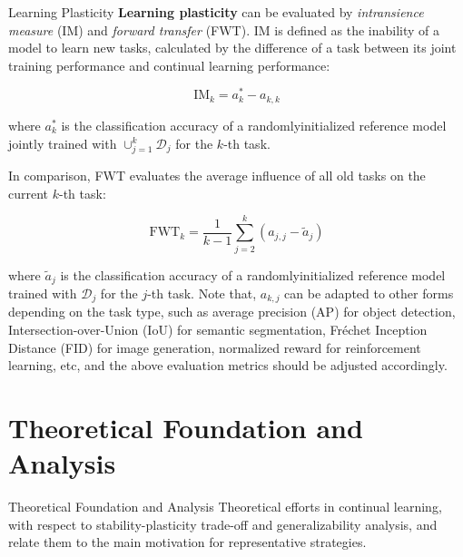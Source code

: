 \documentclass[9pt,dvipsnames]{beamer}
\begin{document}
\begin{frame}{Learning Plasticity}
    \textbf{Learning plasticity} can be evaluated by \textit{intransience measure} (IM) and \textit{forward transfer} (FWT). IM is defined as the inability of a model to learn new tasks, calculated by the difference of a task between its joint training performance and continual learning performance:

    $$
        \mathrm{IM}_{k}=a_{k}^{*}-a_{k, k}
    $$

    where $a_{k}^{*}$ is the classification accuracy of a randomlyinitialized reference model jointly trained with $\cup_{j=1}^{k} \mathcal{D}_{j}$ for the $k$-th task.

    In comparison, FWT evaluates the average influence of all old tasks on the current $k$-th task:

    $$
        \mathrm{FWT}_{k}=\frac{1}{k-1} \sum_{j=2}^{k}\left(a_{j, j}-\tilde{a}_{j}\right)
    $$

    where $\tilde{a}_{j}$ is the classification accuracy of a randomlyinitialized reference model trained with $\mathcal{D}_{j}$ for the $j$-th task. Note that, $a_{k, j}$ can be adapted to other forms depending on the task type, such as average precision (AP) for object detection, Intersection-over-Union (IoU) for semantic segmentation, Fréchet Inception Distance (FID) for image generation, normalized reward for reinforcement learning, etc, and the above evaluation metrics should be adjusted accordingly.
\end{frame}
\section{Theoretical Foundation and Analysis}
\begin{frame}{Theoretical Foundation and Analysis}
    Theoretical efforts in continual learning, with respect to stability-plasticity trade-off and generalizability analysis, and relate them to the main motivation for representative strategies.
\end{frame}
\end{document}
